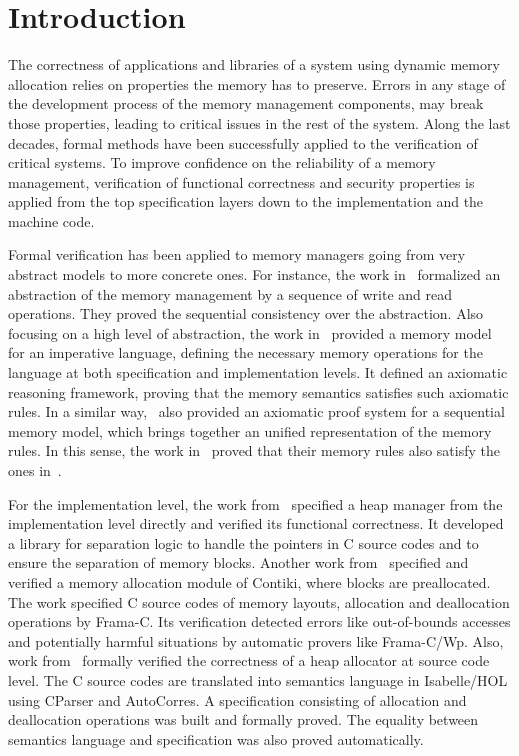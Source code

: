\section{Introduction}
The correctness of applications and libraries of a system using dynamic memory allocation relies on properties the memory has to preserve. Errors in any stage of the development process of the memory management components, may break those properties, leading to critical issues in the rest of the system. Along the last decades, formal methods have been successfully applied to the verification of critical systems. To improve confidence on the reliability of a memory management, verification of functional correctness and security properties is applied from the top specification layers down to the implementation and the machine code.

Formal verification has been applied to memory managers going from very abstract models to more concrete ones. For instance, the work in~\cite{reg_higham} formalized an abstraction of the memory management by a sequence of write and read operations. They proved the sequential consistency over the abstraction. Also focusing on a high level of abstraction, the work in~\cite{reg_blazy} provided a memory model for an imperative language, defining the necessary memory operations for the language at both specification and implementation levels. It defined an axiomatic reasoning framework, proving that the memory semantics satisfies such axiomatic rules. In a similar way,~\cite{reg_mansky} also provided an axiomatic proof system for a sequential memory model, which brings together an unified representation of the memory rules. In this sense, the work in~\cite{reg_mansky} proved that their memory rules also satisfy the ones in~\cite{reg_blazy}.

For the implementation level, the work from~\cite{reg_marti} specified a heap manager from the implementation level directly and verified its functional correctness. It developed a library for separation logic to handle the pointers in C source codes and to ensure the separation of memory blocks. Another work from~\cite{reg_mangano} specified and verified a memory allocation module of Contiki, where blocks are preallocated. The work specified C source codes of memory layouts, allocation and deallocation operations by Frama-C. Its verification detected errors like out-of-bounds accesses and potentially harmful situations by automatic provers like Frama-C/Wp. Also, work from~\cite{reg_sahebolamri} formally verified the correctness of a heap allocator at source code level. The C source codes are translated into semantics language in Isabelle/HOL using CParser and AutoCorres. A specification consisting of allocation and deallocation operations was built and formally proved. The equality between semantics language and specification was also proved automatically.

